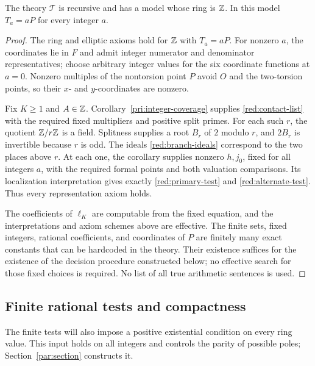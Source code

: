 \begin{lemma}\label{red:standard-model}
The theory \(\mathcal T\) is recursive and has a model whose ring is
\(\mathbb Z\). In this model \(T_a=aP\) for every integer \(a\).
\end{lemma}

\begin{proof}
The ring and elliptic axioms hold for \(\mathbb Z\) with \(T_a=aP\).
For nonzero \(a\), the coordinates lie in \(F\) and admit integer
numerator and denominator representatives; choose arbitrary integer
values for the six coordinate functions at \(a=0\).
Nonzero multiples of the nontorsion point \(P\)
avoid \(O\) and the two-torsion points, so their \(x\)- and
\(y\)-coordinates are nonzero.

Fix \(K\ge1\) and \(A\in\mathbb Z\).  Corollary~\ref{pri:integer-coverage}
supplies \eqref{red:contact-list} with the required fixed multipliers and
positive split primes.  For each such \(r\), the quotient \(\mathbb Z/r\mathbb Z\)
is a field.  Splitness supplies a root \(B_r\) of \(2\) modulo \(r\),
and \(2B_r\) is invertible because \(r\) is odd.  The ideals
\eqref{red:branch-ideals} correspond to the two places above \(r\).
At each one, the corollary supplies nonzero \(h,j_0\), fixed for all
integers \(a\), with the required formal points and both valuation
comparisons.  Its localization interpretation gives exactly
\eqref{red:primary-test} and \eqref{red:alternate-test}.  Thus every
representation axiom holds.

The coefficients of \(\ell_K\) are computable from the fixed equation,
and the interpretations and axiom schemes above are effective. The
finite sets, fixed integers, rational coefficients, and coordinates
of \(P\) are finitely many exact constants that can be hardcoded in
the theory. Their existence suffices for the existence of the decision
procedure constructed below; no effective search for those fixed
choices is required. No list of all true arithmetic sentences is used.
\end{proof}

\subsection{Finite rational tests and compactness}
\label{red:finite-tests}

The finite tests will also impose a positive existential condition on
every ring value.  This input holds on all integers and controls the parity
of possible poles; Section~\ref{par:section} constructs it.

